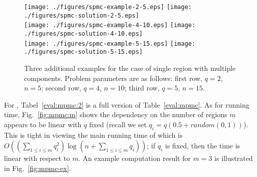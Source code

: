 \begin{figure}[ht!]
    \centering
    \texttt{[image: ./figures/spmc-example-2-5.eps]}
    \texttt{[image: ./figures/spmc-solution-2-5.eps]}
    \vspace*{2mm} \\
    \texttt{[image: ./figures/spmc-example-4-10.eps]}
    \texttt{[image: ./figures/spmc-solution-4-10.eps]} \\
    \vspace*{2mm}
    \texttt{[image: ./figures/spmc-example-5-15.eps]}
    \hspace{5mm}
    \texttt{[image: ./figures/spmc-solution-5-15.eps]}
    \vspace*{-3mm}
    \caption{\label{fig:more-spmc-ex} Three additional examples for the 
		case of single region with multiple components. Problem parameters 
		are as follows: first row, $q = 2$, $n = 5$; second row, $q = 4$, 
		$n = 10$; third row, $q = 5$, $n = 15$.} 
    \vspace*{-4mm}
\end{figure}


For \algoMRG, Tabel~\ref{eval:mpmc:2} is a full version of 
Table~\ref{eval:mpmc}. As for running time, Fig.~\ref{fig:mpmc:m} shows 
the dependency on the number of regions $m$ appears to be linear with 
$q$ fixed (recall we set $q_i = q(0.5 + random(0,1))$). This is tight
in viewing the main running time of \algoMRG which is 
$O((\sum_{1\le i \le m} q_i^2) \log(n + \sum_{1\le i \le m} q_i))$; if
$q_i$ is fixed, then the time is linear with respect to $m$. An example 
computation result for $m = 3$ is illustrated in Fig.~\ref{fig:mpmc-ex}. 

